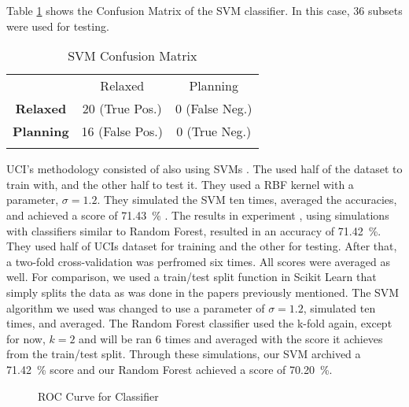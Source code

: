 \documentclass[conference,compsoc]{IEEEtran}
\begin{document}
Table \ref{table5} shows the Confusion Matrix of the SVM classifier. In this case, $36$ subsets were used for testing.
\begin{table}
\centering
\caption{SVM Confusion Matrix}
\label{table5}
\begin{tabularx}{.7\textwidth}{>{\bfseries} c | c c | }
& Relaxed & \multicolumn{1}{c}{Planning}\\
\hhline{---}
Relaxed & 20 (True Pos.) \cellcolor[gray]{.8}& 0 (False Neg.) \\ 
Planning & 16 (False Pos.) & 0 (True Neg.) \cellcolor[gray]{.8} \\
\hhline{~--}
\end{tabularx}

\end{table}

UCI's methodology consisted of also using SVMs \cite{classsvm}. The used half of the dataset to train with, and the other half to test it. 
They used a RBF kernel with a parameter, $\sigma = 1.2$. They simulated the SVM ten times, averaged the accuracies, and achieved a score of \SI{71.43}{\percent} \cite{classsvm}.
The results in experiment \cite{fuzzy}, using simulations with classifiers similar to Random Forest, resulted in an accuracy of \SI{71.42}{\percent}. They used half of UCIs dataset for training and the other for testing. After that, a two-fold cross-validation was perfromed six times. All scores were averaged as well.  For comparison, we used a train/test split function in Scikit Learn that simply splits the data as was done in the papers previously mentioned. The SVM algorithm we used 
was changed to use a parameter of $\sigma = 1.2$, simulated ten times, and averaged. The Random Forest classifier used the k-fold again, except for now, $k = 2$ and will be 
ran 6 times and averaged with the score it achieves from the train/test split. Through these simulations, our SVM archived a \SI{71.42}{\percent} score and our 
Random Forest achieved a score of \SI{70.20}{\percent}.
\begin{figure}
\caption{ROC Curve for Classifier}
\label{fg:ROC}

\end{figure}
\end{document}
